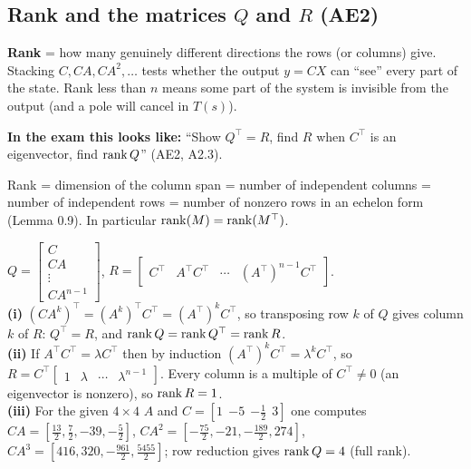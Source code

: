 \subsection{Rank \texorpdfstring{}{} and the matrices \texorpdfstring{$Q$}{Q} and \texorpdfstring{$R$}{R} (AE2)}\label{sec:rank}\label{ss:2-4}
\begin{plainbox}
\textbf{Rank} = how many genuinely different directions the rows (or columns) give. Stacking $C, CA, CA^2,\dots$ tests whether the
output $y=CX$ can ``see'' every part of the state. Rank less than $n$ means some part of the system is invisible from the output
(and a pole will cancel in $T(s)$).
\par\smallskip\textbf{In the exam this looks like:} ``Show $Q^\top=R$, find $R$ when $C^\top$ is an eigenvector, find $\operatorname{rank} Q$'' (AE2, A2.3).
\end{plainbox}
\begin{defbox}
Rank = dimension of the column span = number of independent columns = number of independent rows = number of nonzero rows in an echelon form (Lemma 0.9).
In particular $\operatorname{rank}(M)=\operatorname{rank}(M^\top)$.
\end{defbox}
\begin{workbox}[title={Worked example (AE2, A2.3)}]
$Q=\begin{bmatrix}C\\CA\\\vdots\\CA^{n-1}\end{bmatrix}$, \quad $R=\begin{bmatrix}C^\top&A^\top C^\top&\cdots&(A^\top)^{n-1}C^\top\end{bmatrix}$.\\
\textbf{(i)} $(CA^k)^\top=(A^k)^\top C^\top=(A^\top)^kC^\top$, so transposing row $k$ of $Q$ gives column $k$ of $R$: $Q^\top=R$, and $\operatorname{rank} Q=\operatorname{rank} Q^\top=\operatorname{rank} R$.\\
\textbf{(ii)} If $A^\top C^\top=\lambda C^\top$ then by induction $(A^\top)^kC^\top=\lambda^kC^\top$, so
$R=C^\top\begin{bmatrix}1&\lambda&\cdots&\lambda^{n-1}\end{bmatrix}$. Every column is a multiple of $C^\top\neq0$ (an eigenvector is nonzero), so $\operatorname{rank} R=1$.\\
\textbf{(iii)} For the given $4\times4$ $A$ and $C=[1\ \ {-5}\ \ {-\tfrac12}\ \ 3]$ one computes
$CA=[\tfrac{13}2,\tfrac72,-39,-\tfrac52]$, $CA^2=[-\tfrac{75}2,-21,-\tfrac{189}2,274]$, $CA^3=[416,320,-\tfrac{961}2,\tfrac{5455}2]$; row reduction gives $\operatorname{rank} Q=4$ (full rank).
\end{workbox}
